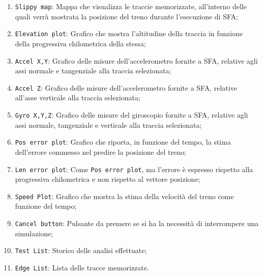 \begin{enumerate}
\item \texttt{Slippy map}: Mappa che visualizza le traccie memorizzate, all'interno delle quali verr\`a mostrata la posizione del treno durante l'esecuzione di SFA;
\item \texttt{Elevation plot}: Grafico che mostra l'altitudine della traccia in funzione della progressiva chilometrica della stessa;
\item \texttt{Accel X,Y}: Grafico delle misure dell'accelerometro fornite a SFA, relative agli assi normale e tangenziale alla traccia selezionata;
\item \texttt{Accel Z}: Grafico delle misure dell'accelerometro fornite a SFA, relative all'asse verticale alla traccia selezionata; 
\item \texttt{Gyro X,Y,Z}: Grafico delle misure del giroscopio fornite a SFA, relative agli assi normale, tangenziale e verticale alla traccia selezionata;
\item \texttt{Pos error plot}: Grafico che riporta, in funzione del tempo, la stima dell'errore commesso nel predire la posizione del treno;
\item \texttt{Len error plot}: Come \texttt{Pos error plot}, ma l'errore \`e espresso rispetto alla progressiva chilometrica e non rispetto al vettore posizione;
\item \texttt{Speed Plot}: Grafico che mostra la stima della velocit\`a del treno come funzione del tempo;
\item \texttt{Cancel button}: Pulsante da premere se si ha la necessit\`a di interrompere una simulazione;
\item \texttt{Test List}: Storico delle analisi effettuate;
\item \texttt{Edge List}: Lista delle tracce memorizzate.
\end{enumerate}
